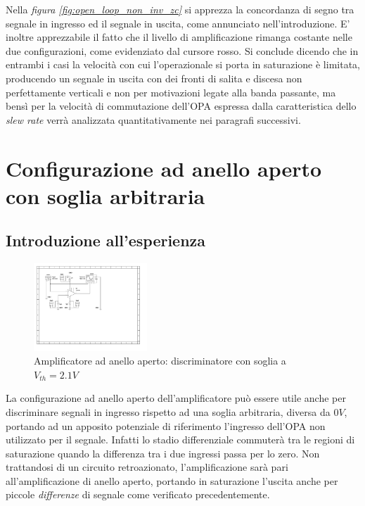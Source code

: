 \documentclass[journal]{IEEEtran}
\begin{document}
Nella \textit{figura \ref{fig:open_loop_non_inv_zc}} si apprezza la concordanza di segno tra segnale in ingresso ed il segnale in uscita, come annunciato nell'introduzione. E' inoltre apprezzabile il fatto che il livello di amplificazione rimanga costante nelle due configurazioni, come evidenziato dal cursore rosso.
Si conclude dicendo che in entrambi i casi la velocità con cui l'operazionale si porta in saturazione è limitata, producendo un segnale in uscita con dei fronti di salita e discesa non perfettamente verticali e non per motivazioni legate alla banda passante, ma bensì per la velocità di commutazione dell'OPA espressa dalla caratteristica dello \textit{slew rate} verrà analizzata quantitativamente nei paragrafi successivi.  

\section{\textbf{Configurazione ad anello aperto con soglia arbitraria}} %

\subsection{\textbf{Introduzione all'esperienza}}
\begin{figure}[H]%
\begin {center}
\includegraphics[width=0.38\textwidth]{sch-simulations/output/OPA-biased.pdf}
\caption{Amplificatore ad anello aperto: discriminatore con soglia a $V_{th} = 2.1 V$}
\label{fig:circ_open_loop_biased}
\end {center}
\end{figure}

La configurazione ad anello aperto dell'amplificatore può essere utile anche per discriminare segnali in ingresso rispetto ad una soglia arbitraria, diversa da $0V$, portando ad un apposito potenziale di riferimento l'ingresso dell'OPA non utilizzato per il segnale. Infatti lo stadio differenziale commuterà tra le regioni di saturazione quando la differenza tra i due ingressi passa per lo zero.
Non trattandosi di un circuito retroazionato, l'amplificazione sarà pari all'amplificazione di anello aperto, portando in saturazione l'uscita anche per piccole \textit{differenze} di segnale come verificato precedentemente.
\end{document}
